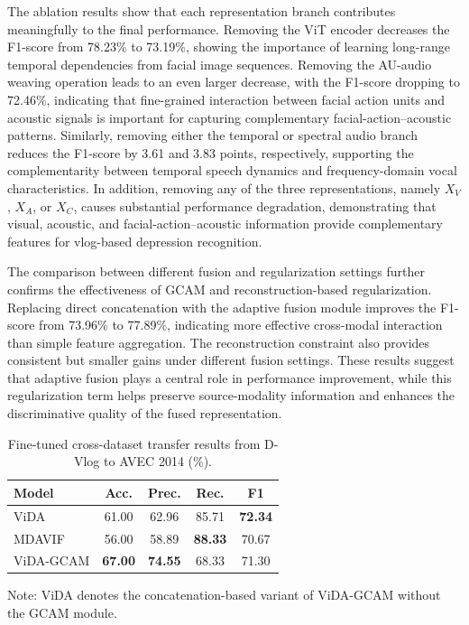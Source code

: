 \documentclass[a4paper,fleqn]{cas-dc}
\begin{document}
The ablation results show that each representation branch contributes meaningfully to the final performance. Removing the ViT encoder decreases the F1-score from 78.23\% to 73.19\%, showing the importance of learning long-range temporal dependencies from facial image sequences. Removing the AU-audio weaving operation leads to an even larger decrease, with the F1-score dropping to 72.46\%, indicating that fine-grained interaction between facial action units and acoustic signals is important for capturing complementary facial-action–acoustic patterns. Similarly, removing either the temporal or spectral audio branch reduces the F1-score by 3.61 and 3.83 points, respectively, supporting the complementarity between temporal speech dynamics and frequency-domain vocal characteristics. In addition, removing any of the three representations, namely $X_V$, $X_A$, or $X_C$, causes substantial performance degradation, demonstrating that visual, acoustic, and facial-action–acoustic information provide complementary features for vlog-based depression recognition.


The comparison between different fusion and regularization settings further confirms the effectiveness of GCAM and reconstruction-based regularization. Replacing direct concatenation with the adaptive fusion module improves the F1-score from 73.96\% to 77.89\%, indicating more effective cross-modal interaction than simple feature aggregation. The reconstruction constraint also provides consistent but smaller gains under different fusion settings. These results suggest that adaptive fusion plays a central role in performance improvement, while this regularization term helps preserve source-modality information and enhances the discriminative quality of the fused representation.


\begin{table}[t]
\centering
\caption{Fine-tuned cross-dataset transfer results from D-Vlog to AVEC 2014 (\%).}
\label{tab:cross_dataset}
\begin{tabular}{lcccc}
\hline
Model & Acc. & Prec. & Rec. & F1 \\
\hline
ViDA & 61.00 & 62.96 & 85.71 & \textbf{72.34} \\
MDAVIF~\cite{model:MDAVIF} & 56.00 & 58.89 & \textbf{88.33} & 70.67 \\
ViDA-GCAM & \textbf{67.00} & \textbf{74.55} & 68.33 & 71.30 \\
\hline
\end{tabular}

\smallskip
{\footnotesize
\noindent Note: ViDA denotes the concatenation-based variant of ViDA-GCAM without the GCAM module.\par
}
\end{table}
\end{document}
